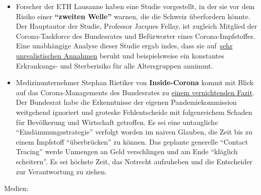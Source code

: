 \begin{itemize}
{  Annahmen}.
\item
  Forscher der ETH Lausanne haben eine Studie vorgestellt, in der sie
  vor dem Risiko einer \textbf{``zweiten Welle''} warnen, die die
  Schweiz überfordern könnte. Der Hauptautor der Studie, Professor
  Jacques Fellay, ist zugleich Mitglied der Corona-Taskforce des
  Bundesrates und Befürworter eines Corona-Impfstoffes. Eine unabhängige
  Analyse dieser Studie ergab indes, dass sie
  auf~\href{https://www.heise.de/tp/features/Fellay-Studie-Zweite-Corona-Welle-4726303.html}{sehr
  unrealistischen Annahmen} beruht und beispielsweise ein konstantes
  Erkrankungs- und Sterberisiko für alle Altersgruppen annimmt.
\item
  Medizinunternehmer Stephan Rietiker von \textbf{Inside-Corona} kommt
  mit Blick auf das Corona-Managements des Bundesrates zu
  \href{https://www.insidecorona.ch/2020/05/21/coronakrise-professionelles-krisenmanagement-sieht-anders-aus/}{einem
  vernichtenden Fazit}. Der Bundesrat habe die Erkenntnisse der eigenen
  Pandemiekommission weitgehend ignoriert und groteske Fehlentscheide
  mit folgenreichem Schaden für Bevölkerung und Wirtschaft getroffen. Es
  sei eine untaugliche ``Eindämmungsstrategie'' verfolgt worden im
  naiven Glauben, die Zeit bis zu einem Impfstoff ``überbrücken'' zu
  können. Das geplante generelle ``Contact Tracing'' werde Unmengen an
  Geld verschlingen und am Ende ``kläglich scheitern''. Es sei höchste
  Zeit, das Notrecht aufzuheben und die Entscheider zur Verantwortung zu
  ziehen.
\end{itemize}

Medien:

